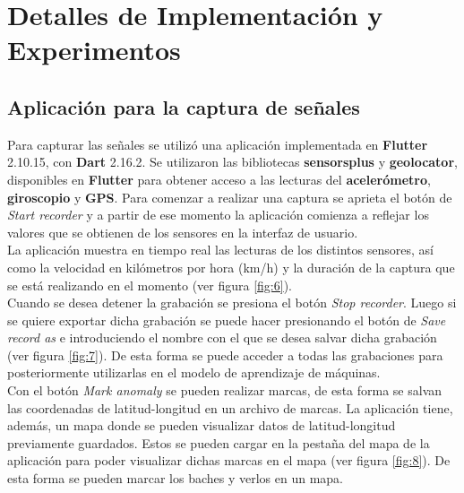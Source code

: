 \chapter{Detalles de Implementación y Experimentos}\label{chapter:implementation}

\section{Aplicación para la captura de señales}
	Para capturar las señales se utilizó una aplicación implementada en \textbf{Flutter} 2.10.15, con \textbf{Dart} 2.16.2.
	Se utilizaron las bibliotecas \textbf{sensors\textunderscore plus} y \textbf{geolocator}, disponibles en \textbf{Flutter} para obtener acceso
	a las lecturas del \textbf {acelerómetro}, \textbf{giroscopio} y \textbf{GPS}. Para comenzar a realizar una captura se aprieta el botón
	de \emph{Start recorder} y a partir de ese momento la aplicación comienza a reflejar los valores que se obtienen de los sensores en la
	interfaz de usuario.\\
	\indent La aplicación muestra en tiempo real las lecturas de los distintos sensores, así como la velocidad en kilómetros por hora (km/h) y la
	duración de la captura que se está realizando en el momento (ver figura \ref{fig:6}).\\
	\indent Cuando se desea detener la grabación se presiona el botón \emph{Stop recorder}. Luego si se quiere exportar dicha grabación se puede
	hacer presionando el botón de \emph{Save record as} e introduciendo el nombre con el que se desea salvar dicha grabación (ver figura
	\ref{fig:7}). De esta forma se puede acceder a todas las grabaciones para posteriormente utilizarlas en el modelo de aprendizaje de máquinas.\\
	\indent Con el botón \emph{Mark anomaly} se pueden realizar marcas, de esta forma se salvan las coordenadas de latitud-longitud en un
	archivo de marcas. La aplicación tiene, además, un mapa donde se pueden visualizar datos de latitud-longitud previamente guardados.
	Estos se pueden cargar en la pestaña del mapa de la aplicación para poder visualizar dichas marcas en el mapa (ver figura \ref{fig:8}).
	De esta forma se pueden marcar los baches y verlos en un mapa.\\
	
